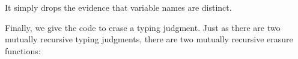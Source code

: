 It simply drops the evidence that variable names are distinct.

Finally, we give the code to erase a typing judgment. Just as there are
two mutually recursive typing judgments, there are two mutually
recursive erasure functions:

\begin{fence}
\begin{code}%
\>[0]\AgdaSpace{}%
\AgdaSymbol{:}\AgdaSpace{}%
\AgdaSpace{}%
\AgdaSymbol{\{}\AgdaSpace{}%
\AgdaSpace{}%
\AgdaSymbol{\}}\AgdaSpace{}%
\AgdaSpace{}%
\AgdaSpace{}%
\AgdaSpace{}%
\AgdaSpace{}%
\AgdaSpace{}%
\AgdaSpace{}%
\AgdaSpace{}%
\AgdaSpace{}%
\AgdaSpace{}%
\AgdaSpace{}%
\AgdaSpace{}%
\AgdaSpace{}%
\AgdaSpace{}%
\<%
\\
\>[0]\AgdaSpace{}%
\AgdaSymbol{:}\AgdaSpace{}%
\AgdaSpace{}%
\AgdaSymbol{\{}\AgdaSpace{}%
\AgdaSpace{}%
\AgdaSymbol{\}}\AgdaSpace{}%
\AgdaSpace{}%
\AgdaSpace{}%
\AgdaSpace{}%
\AgdaSpace{}%
\AgdaSpace{}%
\AgdaSpace{}%
\AgdaSpace{}%
\AgdaSpace{}%
\AgdaSpace{}%
\AgdaSpace{}%
\AgdaSpace{}%
\AgdaSpace{}%
\AgdaSpace{}%
\<%
\\
%
\\[\AgdaEmptyExtraSkip]%
\>[0]\AgdaSpace{}%
\AgdaSpace{}%
\AgdaSpace{}%
%
\>[21]\AgdaSymbol{=}%
\>[24]\AgdaSpace{}%
\AgdaSpace{}%
\AgdaSpace{}%
\<%
\\
\>[0]\AgdaSpace{}%
\AgdaSpace{}%
\AgdaSpace{}%
\AgdaSpace{}%

\end{code}
\end{fence}
